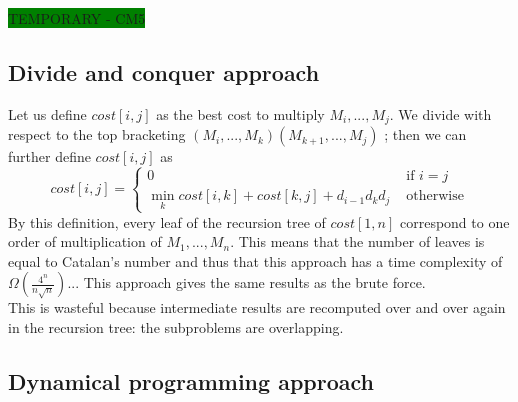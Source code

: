 \colorbox{green}{TEMPORARY - CM5}

%

\subsection{Divide and conquer approach} 

Let us define $cost[i,j]$ as the best cost to multiply $M_i,...,M_j$. We divide with respect to the top bracketing $(M_i,...,M_k)(M_{k+1},...,M_j)$ ; then we can further define $cost[i,j]$ as 
\begin{equation}
 cost[i,j] = \begin{cases} 
 	0 & \text{ if } i=j \\
 	\min_k cost[i,k] + cost[k,j] + d_{i-1}d_kd_j & \text{ otherwise}
 \end{cases}
 \label{eq1}
\end{equation}
By this definition, every leaf of the recursion tree of $cost[1,n]$ correspond to one order of multiplication of $M_1,...,M_n$. This means that the number of leaves is equal to Catalan's number and thus that this approach has a time complexity of $\Omega  (\frac{4^n}{n\sqrt{n}})$... This approach gives the same results as the brute force.\\

This is wasteful because intermediate results are recomputed over and over again in the recursion tree: the subproblems are overlapping.

\subsection{Dynamical programming approach}

